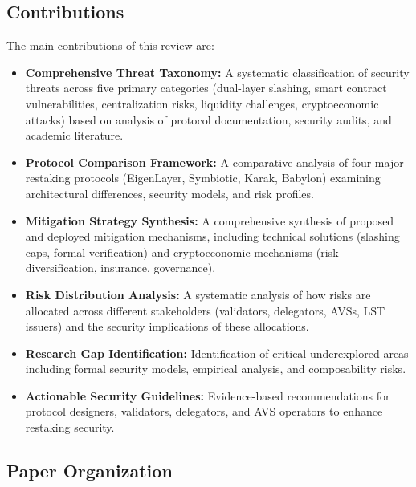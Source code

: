 \documentclass[runningheads]{llncs}
\begin{document}
\subsection{Contributions}

The main contributions of this review are:

\begin{itemize}
    \item \textbf{Comprehensive Threat Taxonomy:} A systematic classification of security threats across five primary categories (dual-layer slashing, smart contract vulnerabilities, centralization risks, liquidity challenges, cryptoeconomic attacks) based on analysis of protocol documentation, security audits, and academic literature.
    
    \item \textbf{Protocol Comparison Framework:} A comparative analysis of four major restaking protocols (EigenLayer, Symbiotic, Karak, Babylon) examining architectural differences, security models, and risk profiles.
    
    \item \textbf{Mitigation Strategy Synthesis:} A comprehensive synthesis of proposed and deployed mitigation mechanisms, including technical solutions (slashing caps, formal verification) and cryptoeconomic mechanisms (risk diversification, insurance, governance).
    
    \item \textbf{Risk Distribution Analysis:} A systematic analysis of how risks are allocated across different stakeholders (validators, delegators, AVSs, LST issuers) and the security implications of these allocations.
    
    \item \textbf{Research Gap Identification:} Identification of critical underexplored areas including formal security models, empirical analysis, and composability risks.
    
    \item \textbf{Actionable Security Guidelines:} Evidence-based recommendations for protocol designers, validators, delegators, and AVS operators to enhance restaking security.
\end{itemize}

\subsection{Paper Organization}
\end{document}
